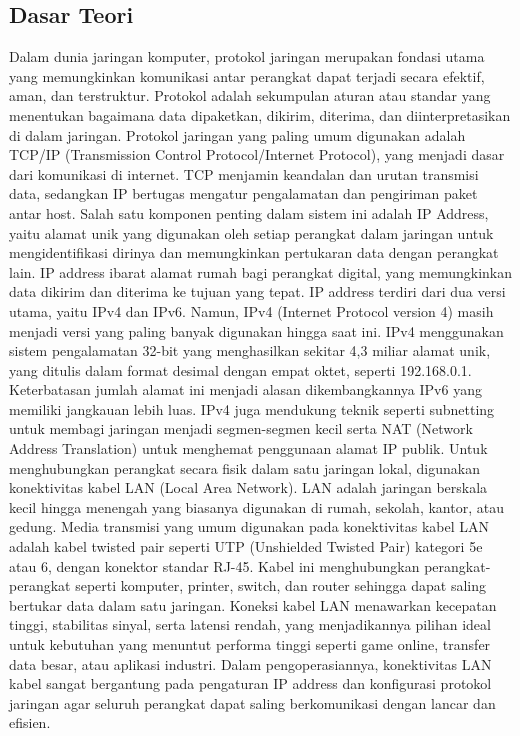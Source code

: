 \subsection{Dasar Teori}
Dalam dunia jaringan komputer, protokol jaringan merupakan fondasi utama yang memungkinkan komunikasi antar perangkat dapat terjadi secara efektif, aman, dan terstruktur. Protokol adalah sekumpulan aturan atau standar yang menentukan bagaimana data dipaketkan, dikirim, diterima, dan diinterpretasikan di dalam jaringan. Protokol jaringan yang paling umum digunakan adalah TCP/IP (Transmission Control Protocol/Internet Protocol), yang menjadi dasar dari komunikasi di internet. TCP menjamin keandalan dan urutan transmisi data, sedangkan IP bertugas mengatur pengalamatan dan pengiriman paket antar host. Salah satu komponen penting dalam sistem ini adalah IP Address, yaitu alamat unik yang digunakan oleh setiap perangkat dalam jaringan untuk mengidentifikasi dirinya dan memungkinkan pertukaran data dengan perangkat lain. IP address ibarat alamat rumah bagi perangkat digital, yang memungkinkan data dikirim dan diterima ke tujuan yang tepat. IP address terdiri dari dua versi utama, yaitu IPv4 dan IPv6. Namun, IPv4 (Internet Protocol version 4) masih menjadi versi yang paling banyak digunakan hingga saat ini. IPv4 menggunakan sistem pengalamatan 32-bit yang menghasilkan sekitar 4,3 miliar alamat unik, yang ditulis dalam format desimal dengan empat oktet, seperti 192.168.0.1. Keterbatasan jumlah alamat ini menjadi alasan dikembangkannya IPv6 yang memiliki jangkauan lebih luas. IPv4 juga mendukung teknik seperti subnetting untuk membagi jaringan menjadi segmen-segmen kecil serta NAT (Network Address Translation) untuk menghemat penggunaan alamat IP publik. Untuk menghubungkan perangkat secara fisik dalam satu jaringan lokal, digunakan konektivitas kabel LAN (Local Area Network). LAN adalah jaringan berskala kecil hingga menengah yang biasanya digunakan di rumah, sekolah, kantor, atau gedung. Media transmisi yang umum digunakan pada konektivitas kabel LAN adalah kabel twisted pair seperti UTP (Unshielded Twisted Pair) kategori 5e atau 6, dengan konektor standar RJ-45. Kabel ini menghubungkan perangkat-perangkat seperti komputer, printer, switch, dan router sehingga dapat saling bertukar data dalam satu jaringan. Koneksi kabel LAN menawarkan kecepatan tinggi, stabilitas sinyal, serta latensi rendah, yang menjadikannya pilihan ideal untuk kebutuhan yang menuntut performa tinggi seperti game online, transfer data besar, atau aplikasi industri. Dalam pengoperasiannya, konektivitas LAN kabel sangat bergantung pada pengaturan IP address dan konfigurasi protokol jaringan agar seluruh perangkat dapat saling berkomunikasi dengan lancar dan efisien.

